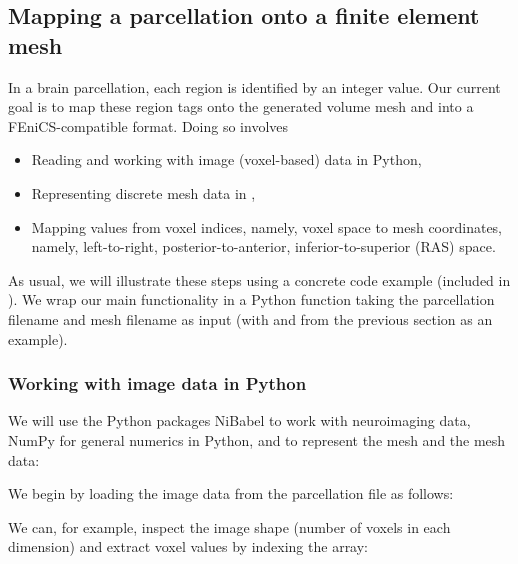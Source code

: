 \subsection{Mapping a parcellation onto a finite element mesh}
\label{sec:chp4:mapping_parcellation}
In a brain parcellation, each region is identified by an integer
value. Our current goal is to map these region tags onto the
generated volume mesh and into a FEniCS-compatible format. Doing so
involves
\begin{itemize}
\item
  Reading and working with image (voxel-based) data in Python, 
\item
  Representing discrete mesh data in {\fenics},
\item
  Mapping values from voxel indices, namely, voxel space to mesh coordinates, %
  namely, left-to-right, posterior-to-anterior, inferior-to-superior (RAS) space.
\end{itemize} 
As usual, we will illustrate these steps using a concrete code example
(included in ). We wrap our
main functionality in a Python function
 taking the parcellation
filename and mesh filename as input (with  and
 from the previous section as an example).

\subsubsection*{Working with image data in Python}

We will use the Python packages NiBabel to work %
with neuroimaging data, NumPy for general numerics in Python, and {\fenics} to 
represent the mesh and the mesh data:

\noindent We begin by loading the image data from the parcellation
file as follows:

\noindent We can, for example, inspect the image shape (number of voxels in
each dimension) and extract voxel values by indexing the
 array:

